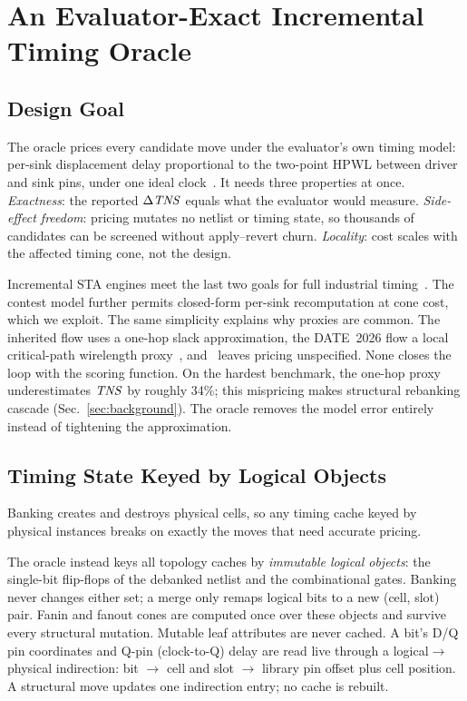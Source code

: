 \section{An Evaluator-Exact Incremental Timing Oracle}
\label{sec:oracle}



\subsection{Design Goal}
\label{sec:oracle:goal}

The oracle prices every candidate move under the evaluator's own timing model: per-sink displacement delay proportional to the two-point HPWL between driver and sink pins, under one ideal clock~\cite{yang2024contest}. It needs three properties at once. \emph{Exactness}: the reported $\Delta\mathit{TNS}$ equals what the evaluator would measure. \emph{Side-effect freedom}: pricing mutates no netlist or timing state, so thousands of candidates can be screened without apply--revert churn. \emph{Locality}: cost scales with the affected timing cone, not the design.

Incremental STA engines meet the last two goals for full industrial timing~\cite{huang2015opentimer,huang2021opentimer2}. The contest model further permits closed-form per-sink recomputation at cone cost, which we exploit. The same simplicity explains why proxies are common. The inherited flow uses a one-hop slack approximation, the DATE~2026 flow a local critical-path wirelength proxy~\cite{chen2026agile}, and~\cite{li2025lbr} leaves pricing unspecified. None closes the loop with the scoring function. On the hardest benchmark, the one-hop proxy underestimates $\mathit{TNS}$ by roughly 34\%; this mispricing makes structural rebanking cascade (Sec.~\ref{sec:background}). The oracle removes the model error entirely instead of tightening the approximation.

\subsection{Timing State Keyed by Logical Objects}
\label{sec:oracle:keying}

Banking creates and destroys physical cells, so any timing cache keyed by physical instances breaks on exactly the moves that need accurate pricing.

The oracle instead keys all topology caches by \emph{immutable logical objects}: the single-bit flip-flops of the debanked netlist and the combinational gates. Banking never changes either set; a merge only remaps logical bits to a new (cell, slot) pair. Fanin and fanout cones are computed once over these objects and survive every structural mutation. Mutable leaf attributes are never cached. A bit's D/Q pin coordinates and Q-pin (clock-to-Q) delay are read live through a logical$\to$physical indirection: bit $\to$ cell and slot $\to$ library pin offset plus cell position. A structural move updates one indirection entry; no cache is rebuilt.

